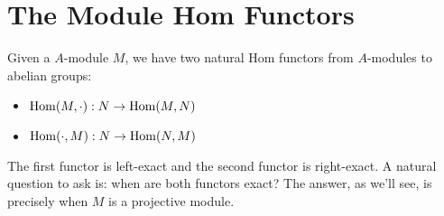 \section{The Module Hom Functors}
Given a $A$-module $M$, we have two natural Hom functors from $A$-modules to abelian groups:
\begin{itemize}
    \item $\operatorname{Hom}(M, \cdot): N \rightarrow \operatorname{Hom}(M, N)$
    \item $\operatorname{Hom}(\cdot, M): N \rightarrow \operatorname{Hom}(N, M)$
\end{itemize}
The first functor is left-exact and the second functor is right-exact. A natural question to ask is: when are both functors exact? The answer, as we'll see, is precisely when $M$ is a projective module.
